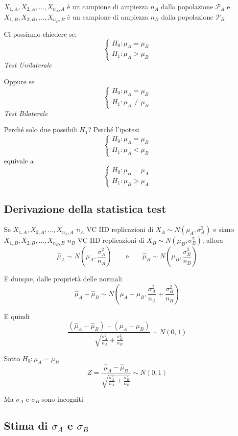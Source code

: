\documentclass[
  11pt,
]{book}
\theoremstyle{mytheoremstyle}
\theoremstyle{mydefstyle}
\begin{document}
\(X_{1,A},X_{2,A},...,X_{n_A,A}\) è un campione di ampiezza \(n_A\) dalla popolazione \(\mathscr{P}_A\) e \(X_{1,B},X_{2,B},...,X_{n_B,B}\) è un campione di ampiezza \(n_B\) dalla popolazione \(\mathscr{P}_B\)

Ci possiamo chiedere se:
\[\begin{cases}
H_0:\mu_A=\mu_B\\
H_1:\mu_A>\mu_B
\end{cases}\]
\emph{Test Unilaterale}

Oppure se
\[\begin{cases}
H_0:\mu_A=\mu_B\\
H_1:\mu_A\neq\mu_B
\end{cases}\]
\emph{Test Bilaterale}

Perché solo due possibili \(H_1\)? Perché l'ipotesi
\[\begin{cases}
H_0:\mu_A=\mu_B\\
H_1:\mu_A<\mu_B
\end{cases}\]
equivale a
\[\begin{cases}
H_0:\mu_B=\mu_A\\
H_1:\mu_B>\mu_A
\end{cases}\]

\subsection{Derivazione della statistica test}\label{derivazione-della-statistica-test}

Se \(X_{1,A},X_{2,A},...,X_{n_A,A}\) \(n_A\) VC IID replicazioni di \(X_A\sim N(\mu_A,\sigma_A^2)\) e siano \(X_{1,B},X_{2,B},...,X_{n_B,B}\) \(n_B\) VC IID replicazioni di \(X_B\sim N(\mu_B,\sigma_B^2)\), allora
\[\hat\mu_A\sim N\left(\mu_A,\frac {\sigma_A^2}{n_A}\right)\qquad\text{e}\qquad\hat\mu_B\sim N\left(\mu_B,\frac {\sigma_B^2}{n_B}\right)\]

E dunque, dalle proprietà delle normali
\[\hat\mu_A - \hat\mu_B\sim N\left(\mu_A-\mu_B,\frac{\sigma^2_A}{n_A}+\frac{\sigma^2_B}{n_B}\right)\]

E quindi
\[\frac{(\hat\mu_A - \hat\mu_B)-(\mu_A-\mu_B)}{\sqrt{\frac{\sigma^2_A}{n_A}+\frac{\sigma^2_B}{n_B}}}\sim N(0,1)\]

Sotto \(H_0:\mu_A=\mu_B\)
\[Z=\frac{\hat\mu_A - \hat\mu_B}{\sqrt{\frac{\sigma^2_A}{n_A}+\frac{\sigma^2_B}{n_B}}}\sim N(0,1)\]

Ma \(\sigma_A\) e \(\sigma_B\) sono incogniti

\subsection{\texorpdfstring{Stima di \(\sigma_A\) e \(\sigma_B\)}{Stima di \textbackslash sigma\_A e \textbackslash sigma\_B}}\label{stima-di-sigma_a-e-sigma_b}
\end{document}
